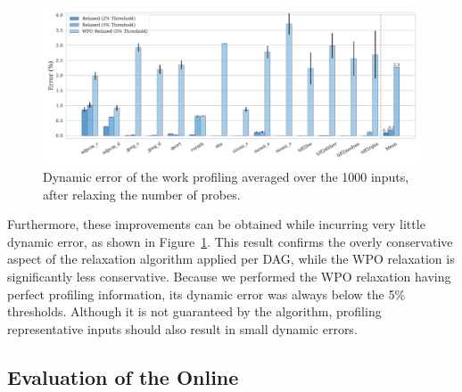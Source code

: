 \begin{figure}[h!]
    \centering
    \includegraphics[width=\textwidth]{figs/error-O3.pdf}
    \caption{Dynamic error of the work profiling averaged over the 1000 inputs, after relaxing the number of probes.}
    \label{fig:error-O3}
\end{figure}


Furthermore, these improvements can be obtained while incurring very little dynamic error, as shown in Figure~\ref{fig:error-O3}.
This result confirms the overly conservative aspect of the relaxation algorithm applied per DAG,
while the WPO relaxation is significantly less conservative.
Because we performed the WPO relaxation having perfect profiling information, its dynamic error was always below the 5\% thresholds.
Although it is not guaranteed by the algorithm, profiling representative inputs should also result in small dynamic errors.

\subsection{Evaluation of the Online {\IterComp}}

